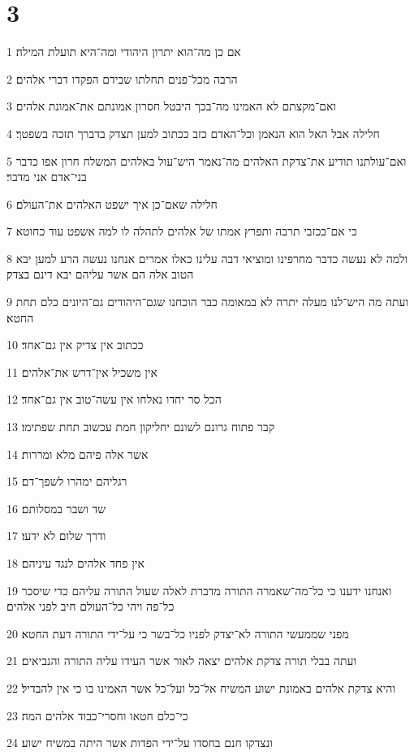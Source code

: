 \chapter{3}

\par 1 אם כן מה־הוא יתרון היהודי ומה־היא תועלת המילה׃
\par 2 הרבה מכל־פנים תחלתו שבידם הפקדו דברי אלהים׃
\par 3 ואם־מקצתם לא האמינו מה־בכך היבטל חסרון אמונתם את־אמונת אלהים׃
\par 4 חלילה אבל האל הוא הנאמן וכל־האדם כזב ככתוב למען תצדק בדברך תזכה בשפטך׃
\par 5 ואם־עולתנו תודיע את־צדקת האלהים מה־נאמר היש־עול באלהים המשלח חרון אפו כדבר בני־אדם אני מדבר׃
\par 6 חלילה שאם־כן איך ישפט האלהים את־העולם׃
\par 7 כי אם־בכזבי תרבה ותפרץ אמתו של אלהים לתהלה לו למה אשפט עוד כחוטא׃
\par 8 ולמה לא נעשה כדבר מחרפינו ומוציאי דבה עלינו כאלו אמרים אנחנו נעשה הרע למען יבא הטוב אלה הם אשר עליהם יבא דינם בצדק׃
\par 9 ועתה מה היש־לנו מעלה יתרה לא במאומה כבר הוכחנו שגם־היהודים גם־היונים כלם תחת החטא׃
\par 10 ככתוב אין צדיק אין גם־אחד׃
\par 11 אין משכיל אין־דרש את־אלהים׃
\par 12 הכל סר יחדו נאלחו אין עשה־טוב אין גם־אחד׃
\par 13 קבר פתוח גרונם לשונם יחליקון חמת עכשוב תחת שפתימו׃
\par 14 אשר אלה פיהם מלא ומררות׃
\par 15 רגליהם ימהרו לשפך־דם׃
\par 16 שד ושבר במסלותם׃
\par 17 ודרך שלום לא ידעו׃
\par 18 אין פחד אלהים לנגד עיניהם׃
\par 19 ואנחנו ידענו כי כל־מה־שאמרה התורה מדברת לאלה שעול התורה עליהם כדי שיסכר כל־פה ויהי כל־העולם חיב לפני אלהים׃
\par 20 מפני שממעשי התורה לא־יצדק לפניו כל־בשר כי על־ידי התורה דעת החטא׃
\par 21 ועתה בבלי תורה צדקת אלהים יצאה לאור אשר העידו עליה התורה והנביאים׃
\par 22 והיא צדקת אלהים באמונת ישוע המשיח אל־כל ועל־כל אשר האמינו בו כי אין להבדיל׃
\par 23 כי־כלם חטאו וחסרי־כבוד אלהים המה׃
\par 24 ונצדקו חנם בחסדו על־ידי הפדות אשר היתה במשיח ישוע׃
